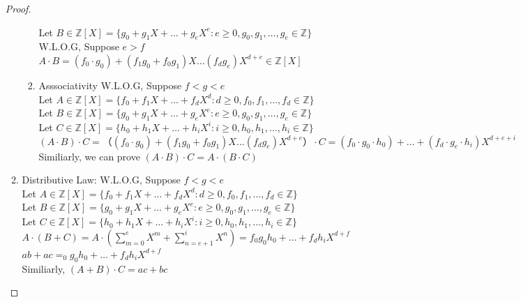 \documentclass{article}
\theoremstyle{break}
\begin{document}
\begin{enumerate}
\begin{proof}
\begin{enumerate}
\begin{enumerate}
                                Let $B \in \mathbb{Z}[X]  =\{g_0+g_1X+\dots+g_eX^e :e\geq 0, g_0, g_1, \dots , g_e \in \mathbb{Z}\}$\\
                                W.L.O.G, Suppose $e >f$\\
                                $A \cdot B = (f_0 \cdot g_0) + (f_1g_0 +  f_0g_1) X \dots (f_dg_e)X^{d+e} \in \mathbb{Z}[X] $
                                \item Asssociativity
                                W.L.O.G, Suppose $f < g < e$\\
                                Let $A \in \mathbb{Z}[X]  =\{f_0+f_1X+\dots+f_dX^d :d\geq 0, f_0, f_1, \dots , f_d \in \mathbb{Z}\}$\\
                                Let $B \in \mathbb{Z}[X]  =\{g_0+g_1X+\dots+g_eX^e :e\geq 0, g_0, g_1, \dots , g_e \in \mathbb{Z}\}$\\
                                Let $C \in \mathbb{Z}[X]  =\{h_0+h_1X+\dots+h_iX^i :i\geq 0, h_0, h_1, \dots , h_i \in \mathbb{Z}\}$\\
                                $(A \cdot B) \cdot C = （(f_0 \cdot g_0) + (f_1g_0 +  f_0g_1) X \dots (f_dg_e)X^{d+e} ）\cdot C = (f_0 \cdot g_0 \cdot h_0) + \dots + (f_d \cdot g_e \cdot h_i) X^{d+e+i}$\\
                                Similiarly, we can prove $(A \cdot B) \cdot C  = A \cdot (B \cdot C)$
                        \end{enumerate}
                        \item Distributive Law: 
                        W.L.O.G, Suppose $f < g < e$\\
                        Let $A \in \mathbb{Z}[X]  =\{f_0+f_1X+\dots+f_dX^d :d\geq 0, f_0, f_1, \dots , f_d \in \mathbb{Z}\}$\\
                        Let $B \in \mathbb{Z}[X]  =\{g_0+g_1X+\dots+g_eX^e :e\geq 0, g_0, g_1, \dots , g_e \in \mathbb{Z}\}$\\
                        Let $C \in \mathbb{Z}[X]  =\{h_0+h_1X+\dots+h_iX^i :i\geq 0, h_0, h_1, \dots , h_i \in \mathbb{Z}\}$\\
                        $A \cdot (B+C) = A \cdot (\sum_{m=0}^{e}X^m + \sum_{n=e+1}^{i}X^n) = f_0g_0h_0 + \dots + f_dh_iX^{d+f}$\\
                        $ab + ac = _0g_0h_0 + \dots + f_dh_iX^{d+f}$  \\
                        Similiarly, $(A+B)\cdot C = ac + bc$
                \end{enumerate}

\end{proof}
\end{enumerate}
\end{document}
